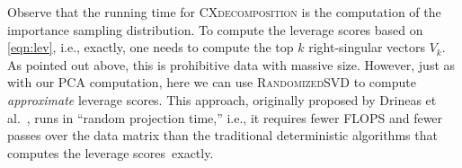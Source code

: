 Observe that the running time for \textsc{CXdecomposition} is the computation of the importance sampling distribution.
To compute the leverage scores based on \eqref{eqn:lev}, i.e., exactly, one needs to compute the top $k$ right-singular vectors $V_k$. 
As pointed out above, this is prohibitive data with massive size.
However, just as with our PCA computation, here we can use \textsc{RandomizedSVD} to compute {\it approximate} leverage scores.
This approach, originally proposed by Drineas et al.~\cite{DMMW12_JMLR}, runs in ``random projection time,'' i.e., it requires fewer FLOPS and fewer passes over the data matrix than the traditional deterministic algorithms that computes the leverage scores~exactly.



